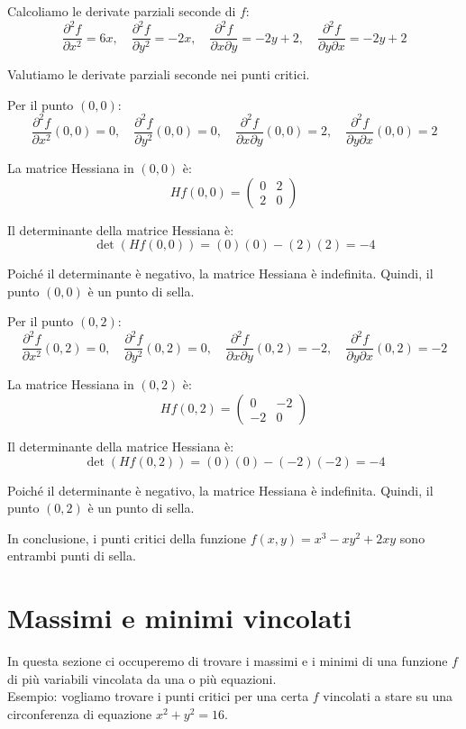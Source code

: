 Calcoliamo le derivate parziali seconde di $f$:
\[
\frac{\partial^2 f}{\partial x^2} = 6x, \quad \frac{\partial^2 f}{\partial y^2} = -2x, \quad \frac{\partial^2 f}{\partial x \partial y} = -2y + 2, \quad \frac{\partial^2 f}{\partial y \partial x} = -2y + 2
\]

Valutiamo le derivate parziali seconde nei punti critici.

Per il punto $(0,0)$:
\[
\frac{\partial^2 f}{\partial x^2}(0,0) = 0, \quad \frac{\partial^2 f}{\partial y^2}(0,0) = 0, \quad \frac{\partial^2 f}{\partial x \partial y}(0,0) = 2, \quad \frac{\partial^2 f}{\partial y \partial x}(0,0) = 2
\]

La matrice Hessiana in $(0,0)$ è:
\[
Hf(0,0) = \begin{pmatrix}
0 & 2 \\
2 & 0
\end{pmatrix}
\]

Il determinante della matrice Hessiana è:
\[
\det(Hf(0,0)) = (0)(0) - (2)(2) = -4
\]

Poiché il determinante è negativo, la matrice Hessiana è indefinita. Quindi, il punto $(0,0)$ è un punto di sella.

Per il punto $(0,2)$:
\[
\frac{\partial^2 f}{\partial x^2}(0,2) = 0, \quad \frac{\partial^2 f}{\partial y^2}(0,2) = 0, \quad \frac{\partial^2 f}{\partial x \partial y}(0,2) = -2, \quad \frac{\partial^2 f}{\partial y \partial x}(0,2) = -2
\]

La matrice Hessiana in $(0,2)$ è:
\[
Hf(0,2) = \begin{pmatrix}
0 & -2 \\
-2 & 0
\end{pmatrix}
\]

Il determinante della matrice Hessiana è:
\[
\det(Hf(0,2)) = (0)(0) - (-2)(-2) = -4
\]

Poiché il determinante è negativo, la matrice Hessiana è indefinita. Quindi, il punto $(0,2)$ è un punto di sella.

In conclusione, i punti critici della funzione $f(x,y) = x^3 - xy^2 + 2xy$ sono entrambi punti di sella.

\section{Massimi e minimi vincolati}
In questa sezione ci occuperemo di trovare i massimi e i minimi di una funzione $f$ di più variabili vincolata da una o più equazioni.\\
Esempio: vogliamo trovare i punti critici per una certa $f$ vincolati a stare su una circonferenza di equazione $x^2 + y^2 = 16$.

